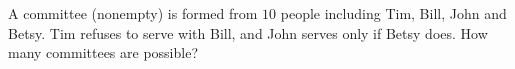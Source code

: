 A committee (nonempty) is formed from $10$ people including Tim, Bill, John and Betsy. Tim refuses to serve with Bill, and John serves only if Betsy does. How many committees are possible?
